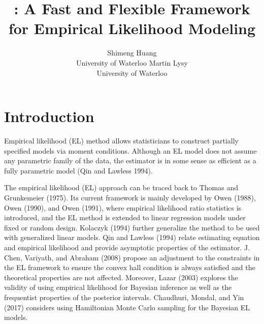 \documentclass[article]{jss}
\author{
Shimeng Huang\\University of Waterloo \And Martin Lysy\\University of Waterloo
}
\title{\pkg{flexEL}: A Fast and Flexible Framework for Empirical Likelihood Modeling}
\renewcommand{\|}{\,|\,}
\begin{document}
\maketitle

%
\hypertarget{introduction}{%
\section{Introduction}\label{introduction}}

Empirical likelihood (EL) method allows statisticians to construct partially specified models via moment conditions. Although an EL model does not assume any parametric family of the data, the estimator is in some sense as efficient as a fully parametric model (Qin and Lawless 1994).

The empirical likelihood (EL) approach can be traced back to Thomas and Grunkemeier (1975). Its current framework is mainly developed by Owen (1988), Owen (1990), and Owen (1991), where empirical likelihood ratio statistics is introduced, and the EL method is extended to linear regression models under fixed or random design. Kolaczyk (1994) further generalize the method to be used with generalized linear models. Qin and Lawless (1994) relate estimating equation and empirical likelihood and provide asymptotic properties of the estimator. J. Chen, Variyath, and Abraham (2008) propose an adjustment to the constraints in the EL framework to ensure the convex hall condition is always satisfied and the theoretical properties are not affected. Moreover, Lazar (2003) explores the validity of using empirical likelihood for Bayesian inference as well as the frequentist properties of the posterior intervals. Chaudhuri, Mondal, and Yin (2017) considers using Hamiltonian Monte Carlo sampling for the Bayesian EL models.
\end{document}
